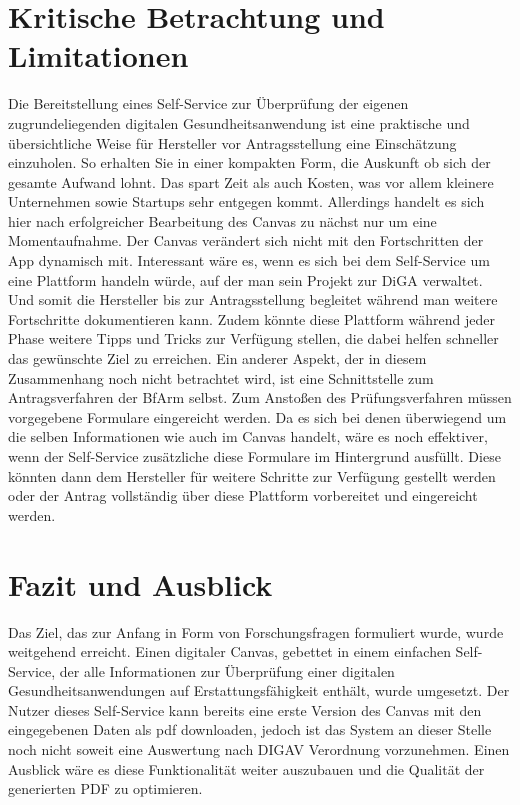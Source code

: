 \section{Kritische Betrachtung und Limitationen}
Die Bereitstellung eines Self-Service zur Überprüfung der eigenen zugrundeliegenden digitalen Gesundheitsanwendung ist eine praktische und übersichtliche Weise für Hersteller vor Antragsstellung eine Einschätzung einzuholen. So erhalten Sie in einer kompakten Form, die Auskunft ob sich der gesamte Aufwand lohnt. Das spart Zeit als auch Kosten, was vor allem kleinere Unternehmen sowie Startups sehr entgegen kommt. Allerdings handelt es sich hier nach erfolgreicher Bearbeitung des Canvas zu nächst nur um eine Momentaufnahme. Der Canvas verändert sich nicht mit den Fortschritten der App dynamisch mit. Interessant wäre es, wenn es sich bei dem Self-Service um eine Plattform handeln würde, auf der man sein Projekt zur DiGA verwaltet. Und somit die Hersteller bis zur Antragsstellung begleitet während man weitere Fortschritte dokumentieren kann. Zudem könnte diese Plattform während jeder Phase weitere Tipps und Tricks zur Verfügung stellen, die dabei helfen schneller das gewünschte Ziel zu erreichen.
Ein anderer Aspekt, der in diesem Zusammenhang noch nicht betrachtet wird, ist eine Schnittstelle zum Antragsverfahren der BfArm selbst. Zum Anstoßen des Prüfungsverfahren müssen vorgegebene Formulare eingereicht werden. Da es sich bei denen überwiegend um die selben Informationen wie auch im Canvas handelt, wäre es noch effektiver, wenn der Self-Service zusätzliche diese Formulare im Hintergrund ausfüllt. Diese könnten dann dem Hersteller für weitere Schritte zur Verfügung gestellt werden oder der Antrag vollständig über diese Plattform vorbereitet und eingereicht werden.
\section{Fazit und Ausblick}
Das Ziel, das zur Anfang in Form von Forschungsfragen formuliert wurde, wurde weitgehend erreicht. Einen digitaler Canvas, gebettet in einem einfachen Self-Service, der alle Informationen zur Überprüfung einer digitalen Gesundheitsanwendungen auf Erstattungsfähigkeit enthält, wurde umgesetzt. Der Nutzer dieses Self-Service kann bereits eine erste Version des Canvas mit den eingegebenen Daten als pdf downloaden, jedoch ist das System an dieser Stelle noch nicht soweit eine Auswertung nach DIGAV Verordnung vorzunehmen. Einen Ausblick wäre es diese Funktionalität weiter auszubauen und die Qualität der generierten PDF zu optimieren.
